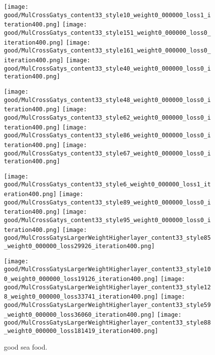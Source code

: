   \begin{figure*}[!htbp]
  \centering
  \small 
  
      \texttt{[image: good/MulCrossGatys\_content33\_style10\_weight0\_000000\_loss1\_iteration400.png]}
      \texttt{[image: good/MulCrossGatys\_content33\_style151\_weight0\_000000\_loss0\_iteration400.png]}
      \texttt{[image: good/MulCrossGatys\_content33\_style161\_weight0\_000000\_loss0\_iteration400.png]}
      \texttt{[image: good/MulCrossGatys\_content33\_style40\_weight0\_000000\_loss0\_iteration400.png]}
      
      \texttt{[image: good/MulCrossGatys\_content33\_style48\_weight0\_000000\_loss0\_iteration400.png]}
      \texttt{[image: good/MulCrossGatys\_content33\_style62\_weight0\_000000\_loss0\_iteration400.png]}
      \texttt{[image: good/MulCrossGatys\_content33\_style86\_weight0\_000000\_loss0\_iteration400.png]}
      \texttt{[image: good/MulCrossGatys\_content33\_style67\_weight0\_000000\_loss0\_iteration400.png]}
      
      \texttt{[image: good/MulCrossGatys\_content33\_style6\_weight0\_000000\_loss1\_iteration400.png]}
      \texttt{[image: good/MulCrossGatys\_content33\_style89\_weight0\_000000\_loss0\_iteration400.png]}
      \texttt{[image: good/MulCrossGatys\_content33\_style95\_weight0\_000000\_loss0\_iteration400.png]}
      \texttt{[image: good/MulCrossGatysLargerWeightHigherlayer\_content33\_style85\_weight0\_000000\_loss29926\_iteration400.png]}
      
          \texttt{[image: good/MulCrossGatysLargerWeightHigherlayer\_content33\_style100\_weight0\_000000\_loss19126\_iteration400.png]}
      \texttt{[image: good/MulCrossGatysLargerWeightHigherlayer\_content33\_style128\_weight0\_000000\_loss33741\_iteration400.png]}
      \texttt{[image: good/MulCrossGatysLargerWeightHigherlayer\_content33\_style59\_weight0\_000000\_loss36060\_iteration400.png]}
      \texttt{[image: good/MulCrossGatysLargerWeightHigherlayer\_content33\_style88\_weight0\_000000\_loss181419\_iteration400.png]}
  \caption{good sea food.  }
  \label{fig:good1}
  \end{figure*}
  
